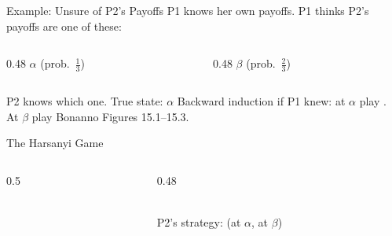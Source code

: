 \begin{frame}{Example: Unsure of P2's Payoffs}
P1 knows her own payoffs. P1 thinks P2's payoffs are one of these:
\bsk
\begin{columns}[T]
\begin{column}{0.48\textwidth}
\centering
$\alpha$ (prob.\ $\tfrac13$)\\
\minigamealpha
\end{column}
\begin{column}{0.48\textwidth}
\centering
$\beta$ (prob.\ $\tfrac23$)\\
\minigamebeta
\end{column}
\end{columns}
\bsk
P2 knows which one. True state: $\alpha$
\bsk
Backward induction if P1 knew: at $\alpha$ play \underline{\hspace{0.3in}}. At $\beta$ play \underline{\hspace{0.3in}}
\vfill
{\footnotesize Bonanno Figures 15.1--15.3.}
\vspace{-0.2in}
\end{frame}

\begin{frame}{The Harsanyi Game}
\begin{columns}[c]
\begin{column}{0.5\textwidth}
\centering
\examplegame
\end{column}
\begin{column}{0.48\textwidth}
\centering
\begin{matrixgame}[top={DD, DA, AD, AA}, left={B, T}, player names={1, 2}, w=1.15]
\end{matrixgame}\\[4pt]
{\footnotesize P2's strategy: (at $\alpha$, at $\beta$)}
\end{column}
\end{columns}
\bsk
{}
\bsk
{}
\vspace{-0.3in}
\end{frame}

